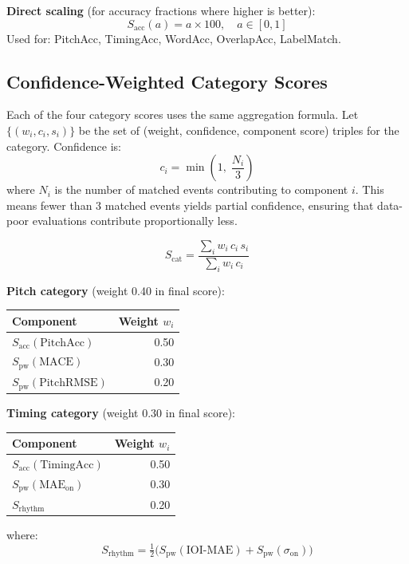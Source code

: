 \documentclass[11pt,letterpaper]{article}
\begin{document}
\textbf{Direct scaling} (for accuracy fractions where higher is better):
\[
  S_\text{acc}(a) = a \times 100, \quad a \in [0,1]
\]
Used for: PitchAcc, TimingAcc, WordAcc, OverlapAcc, LabelMatch.

\subsection{Confidence-Weighted Category Scores}

Each of the four category scores uses the same aggregation formula.
Let $\{(w_i, c_i, s_i)\}$ be the set of (weight, confidence, component score)
triples for the category.
Confidence is:
\[
  c_i = \min\!\left(1,\;\frac{N_i}{3}\right)
\]
where $N_i$ is the number of matched events contributing to component $i$.
This means fewer than 3 matched events yields partial confidence, ensuring
that data-poor evaluations contribute proportionally less.

\[
  S_\text{cat} = \frac{\displaystyle\sum_i w_i\,c_i\,s_i}
                      {\displaystyle\sum_i w_i\,c_i}
\]

\textbf{Pitch category} (weight 0.40 in final score):
\begin{center}
  \begin{tabular}{@{}lr@{}}
    \toprule
    Component & Weight $w_i$ \\
    \midrule
    $S_\text{acc}(\mathrm{PitchAcc})$ & 0.50 \\
    $S_\text{pw}(\mathrm{MACE})$      & 0.30 \\
    $S_\text{pw}(\mathrm{PitchRMSE})$ & 0.20 \\
    \bottomrule
  \end{tabular}
\end{center}

\textbf{Timing category} (weight 0.30 in final score):
\begin{center}
  \begin{tabular}{@{}lr@{}}
    \toprule
    Component & Weight $w_i$ \\
    \midrule
    $S_\text{acc}(\mathrm{TimingAcc})$ & 0.50 \\
    $S_\text{pw}(\mathrm{MAE}_\text{on})$ & 0.30 \\
    $S_\text{rhythm}$ & 0.20 \\
    \bottomrule
  \end{tabular}
\end{center}
where:
\[
  S_\text{rhythm}
    = \tfrac{1}{2}\bigl(S_\text{pw}(\mathrm{IOI\text{-}MAE})
    + S_\text{pw}(\sigma_\text{on})\bigr)
\]
\end{document}
